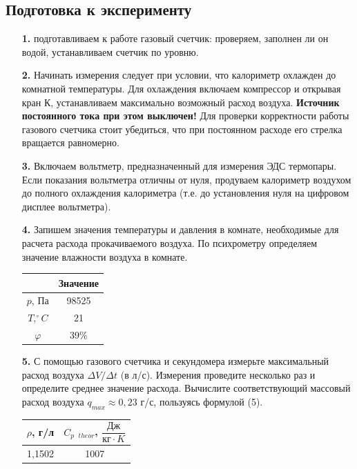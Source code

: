 \documentclass[a4paper, 12pt]{article}%
\begin{document}
\subsection*{Подготовка к эксперименту}
\begin{enumerate}
\item [\textbf{1.}] подготавливаем к работе газовый счетчик: проверяем, заполнен ли он водой, устанавливаем счетчик по уровню.
\item [\textbf{2.}] Начинать измерения следует при условии, что калориметр охлажден до комнатной температуры. Для охлаждения включаем компрессор и открывая кран К, устанавливаем максимально возможный расход воздуха. \textbf{Источник постоянного тока при этом выключен!}
Для проверки корректности работы газового счетчика стоит убедиться, что при постоянном расходе его стрелка вращается равномерно.
\item [\textbf{3.}] Включаем вольтметр, предназначенный для измерения ЭДС термопары. Если показания вольтметра отличны от нуля, продуваем калориметр воздухом до полного охлаждения калориметра (т.е. до установления нуля на цифровом дисплее вольтметра).
\item [\textbf{4.}]Запишем значения температуры и давления в комнате, необходимые для расчета расхода прокачиваемого воздуха. По психрометру определяем значение влажности воздуха в комнате.
\begin{center}
    \begin{tabular}{|c|c|}
\hline
               & Значение \\ \hline
$p$, Па        & 98525    \\ \hline
$T, ^{\circ}C$ & 21       \\ \hline
$\varphi$         & 39\%   \\ \hline
\end{tabular}
  \end{center}
\item [\textbf{5.}] С помощью газового счетчика и секундомера измерьте максимальный расход воздуха $\Delta V/ \Delta t$ (в л/с). Измерения проведите несколько раз и определите среднее значение расхода. Вычислите соответствующий массовый расход воздуха $q_{max} \approx 0,23$ г/с, пользуясь формулой (5).
\begin{center}
\begin{tabular}{|c|c|}
\hline
$\rho$, г/л & $C_{p \text{ } theor}$, $\dfrac{\text{Дж}}{\text{кг}\cdot K}$ \\\hline
1,1502      & 1007                                           \\ \hline
\end{tabular}


\end{center}
\end{enumerate}
\end{document}
